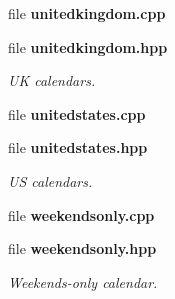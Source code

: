 \begin{DoxyCompactItemize}
file {\bf unitedkingdom.\+cpp}
\item 
file {\bf unitedkingdom.\+hpp}
\begin{DoxyCompactList}\small\item\em UK calendars. \end{DoxyCompactList}\item 
file {\bf unitedstates.\+cpp}
\item 
file {\bf unitedstates.\+hpp}
\begin{DoxyCompactList}\small\item\em US calendars. \end{DoxyCompactList}\item 
file {\bf weekendsonly.\+cpp}
\item 
file {\bf weekendsonly.\+hpp}
\begin{DoxyCompactList}\small\item\em Weekends-\/only calendar. \end{DoxyCompactList}\end{DoxyCompactItemize}
